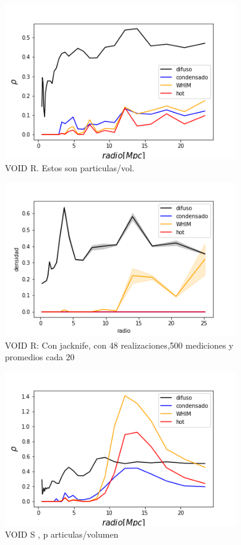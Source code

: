 \begin{figure}[h]
\centering
\includegraphics[width=10cm]{Figures/FasesProf_R.png}
\decoRule
\caption[asd]{VOID R. Estos son particulas/vol.  }
\label{fig:Electron}
\end{figure}

\begin{figure}[h]
\centering
\includegraphics[width=10cm]{Figures/ProfFases_R.png}
\decoRule
\caption[asd]{VOID R: Con jacknife, con 48 realizaciones,500 mediciones y promedios cada 20 }
\label{fig:Electron}
\end{figure}

\begin{figure}[h]
\centering
\includegraphics[width=10cm]{Figures/FasesProf_S.png}
\decoRule
\caption[asd]{VOID S , p articulas/volumen}
\label{fig:Electron}
\end{figure}

